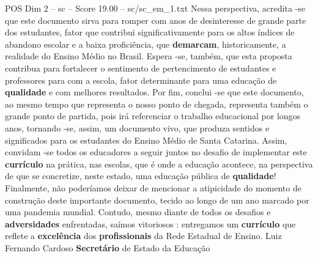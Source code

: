 \begin{textsample}{POS Dim 2 – sc – Score 19.00 – sc/sc\_em\_1.txt}
Nessa perspectiva, acredita -se que este documento sirva para romper com anos de desinteresse de grande parte dos estudantes, fator que contribui significativamente para os altos índices de abandono escolar e a baixa proficiência, que \textbf{demarcam}, historicamente, a realidade do Ensino Médio no Brasil.
Espera -se, também, que esta proposta contribua para fortalecer o sentimento de pertencimento de estudantes e professores para com a escola, fator determinante para uma educação de \textbf{qualidade} e com melhores resultados.
Por fim, conclui -se que este documento, ao mesmo tempo que representa o nosso ponto de chegada, representa também o grande ponto de partida, pois irá referenciar o trabalho educacional por longos anos, tornando -se, assim, um documento vivo, que produza sentidos e significados para os estudantes do Ensino Médio de Santa Catarina.
Assim, convidam -se todos os educadores a seguir juntos no desafio de implementar este \textbf{currículo} na prática, nas escolas, que é onde a educação acontece, na perspectiva de que se concretize, neste estado, uma educação pública de \textbf{qualidade}!
Finalmente, não poderíamos deixar de mencionar a atipicidade do momento de construção deste importante documento, tecido ao longo de um ano marcado por uma pandemia mundial.
Contudo, mesmo diante de todos os desafios e \textbf{adversidades} enfrentadas, saímos vitoriosos : entregamos um \textbf{currículo} que reflete a \textbf{excelência} dos \textbf{profissionais} da Rede Estadual de Ensino.
Luiz Fernando Cardoso \textbf{Secretário} de Estado da Educação

\end{textsample}
